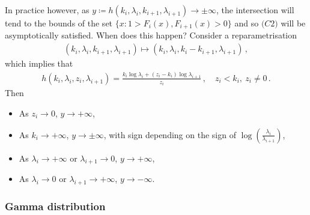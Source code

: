 \documentclass{article}
\begin{document}
%
In practice however, as
$y \coloneqq h(k_i, \lambda_i, k_{i+1}, \lambda_{i+1}) \to \pm \infty$,
the intersection will tend to the bounds of the set
$\{x \colon 1 > F_i(x), F_{i + 1}(x) > 0\}$ and so $\textit{(C2)}$
will be asymptotically satisfied. When does this happen?
Consider a reparametrisation
%
\begin{align*}
	(k_i, \lambda_i, k_{i + 1}, \lambda_{i + 1}) \mapsto
		(k_i, \lambda_i, k_i - {k_{i + 1}}, \lambda_{i + 1}) \,,
\end{align*}
%
which implies that
%
\begin{align*}
	h(k_i, \lambda_i, z_{i}, \lambda_{i+1})
		=\frac{k_i \log\lambda_i + {(z_{i} - k_{i})}
		\log\lambda_{i + 1}}{z_{i}} \,,
		\quad z_{i} < k_i,\ z_{i} \neq 0 \,.
\end{align*}
%
Then
%
\begin{itemize}
	\item As $z_i \to 0$, $y \to +\infty$,
	\item As $k_i \to +\infty$, $y \to \pm\infty$, with sign depending
		on the sign of $\log(\frac{\lambda_i}{\lambda_{i + 1}})$,
	\item As $\lambda_i \to +\infty$ or $\lambda_{i + 1} \to 0$,
		$y \to +\infty$,
	\item As $\lambda_i \to 0$ or  $\lambda_{i + 1}\to +\infty$,
		$y \to -\infty$.
\end{itemize}
%
\subsubsection{Gamma distribution}
%
\end{document}
